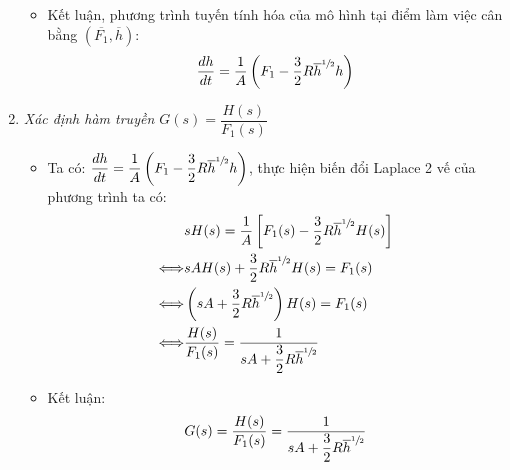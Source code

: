 \begin{enumerate}[\it a.]
\begin{itemize}
                \item Kết luận, phương trình tuyến tính hóa của mô hình tại điểm làm việc cân bằng $\left({\overline{F_1}, \overline{h}}\right)$:
                    \begin{align}
                        \dfrac{dh}{dt} = \dfrac{1}{A} \left({F_1 - \dfrac{3}{2} R \overline{h}^{\sfrac{1}{2}}h}\right)
                    \end{align}
            \end{itemize}

        \item \textit{Xác định hàm truyền $G(s) = \dfrac{H(s)}{F_1(s)}$}
            \begin{itemize}
                \item Ta có: $\dfrac{dh}{dt} = \dfrac{1}{A} \left({F_1 - \dfrac{3}{2} R \overline{h}^{\sfrac{1}{2}} h}\right)$, thực hiện biến đổi Laplace 2 vế của phương trình ta có:
                    \begin{align}
                        & s H(s) = \dfrac{1}{A} \left[{F_1(s) - \dfrac{3}{2} R \overline{h}^{\sfrac{1}{2}} H(s)}\right]\\
                        \Longleftrightarrow & s A H(s) + \dfrac{3}{2} R \overline{h}^{\sfrac{1}{2}} H(s) = F_1(s)\\
                        \Longleftrightarrow & \left({s A + \dfrac{3}{2} R \overline{h}^{\sfrac{1}{2}}}\right) H(s) = F_1(s) \\
                        \Longleftrightarrow & \dfrac{H(s)}{F_1(s)} = \frac{1}{s A + \dfrac{3}{2} R \overline{h}^{\sfrac{1}{2}}}
                    \end{align}

                \item Kết luận:
                    \begin{align}
                        G(s) = \dfrac{H(s)}{F_1(s)} = \frac{1}{s A + \dfrac{3}{2} R \overline{h}^{\sfrac{1}{2}}}
                    \end{align}
            \end{itemize}
    \end{enumerate}
